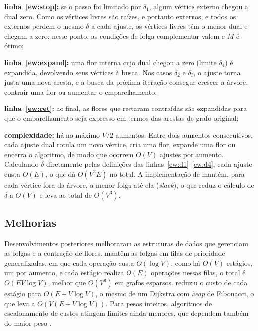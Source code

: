 \begin{alineas}
    \item \textbf{linha~\ref{ew:stop}:} se o passo foi limitado por $\delta_1$, algum vértice externo chegou a dual zero. Como os vértices livres são raízes, e portanto externos, e todos os externos perdem o mesmo $\delta$ a cada ajuste, os vértices livres têm o menor dual e chegam a zero; nesse ponto, as condições de folga complementar valem e $M$ é ótimo;
    \item \textbf{linha~\ref{ew:expand}:} uma flor interna cujo dual chegou a zero (limite $\delta_4$) é expandida, devolvendo seus vértices à busca. Nos casos $\delta_2$ e $\delta_3$, o ajuste torna justa uma nova aresta, e a busca da próxima iteração consegue crescer a árvore, contrair uma flor ou aumentar o emparelhamento;
    \item \textbf{linha~\ref{ew:ret}:} ao final, as flores que restaram contraídas são expandidas para que o emparelhamento seja expresso em termos das arestas do grafo original;
    \item \textbf{complexidade:} há no máximo $V/2$ aumentos. Entre dois aumentos consecutivos, cada ajuste dual rotula um novo vértice, cria uma flor, expande uma flor ou encerra o algoritmo, de modo que ocorrem $O(V)$ ajustes por aumento. Calculando $\delta$ diretamente pelas definições das linhas~\ref{ew:d1}--\ref{ew:d4}, cada ajuste custa $O(E)$, o que dá $O(V^2 E)$ no total. A implementação de  mantém, para cada vértice fora da árvore, a menor folga até ela (\textit{slack}), o que reduz o cálculo de $\delta$ a $O(V)$ e leva ao total de $O(V^3)$.
\end{alineas}

\subsection{Melhorias}

Desenvolvimentos posteriores melhoraram as estruturas de dados que gerenciam as folgas e a contração de flores.  mantêm as folgas em filas de prioridade generalizadas, em que cada operação custa $O(\log V)$; como há $O(V)$ estágios, um por aumento, e cada estágio realiza $O(E)$ operações nessas filas, o total é $O(EV \log V)$, melhor que $O(V^3)$ em grafos esparsos.  reduziu o custo de cada estágio para $O(E + V \log V)$, o mesmo de um Dijkstra com \textit{heap} de Fibonacci, o que leva a $O(V(E + V \log V))$. Para pesos inteiros, algoritmos de escalonamento de custos atingem limites ainda menores, que dependem também do maior peso \cite{gabow1990}.

